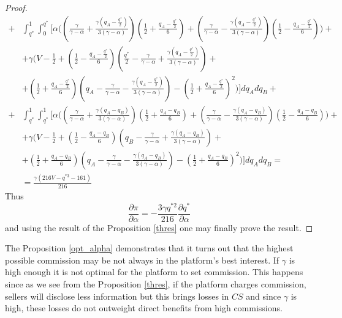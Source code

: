\documentclass[a4paper]{article}
\begin{document}
\begin{proof}
\begin{align*}
	 +
	 &\int_{q^*}^{1} \int_{0}^{q^*} \biggl[ \alpha \biggl( \left( \frac{\gamma}{\gamma - \alpha} + \frac{\gamma\left(q_A - \frac{q^*}{2} \right) }{3(\gamma - \alpha)} \right)\left(\frac{1}{2} + \frac{q_A - \frac{q^*}{2}}{6} \right) + \left( \frac{\gamma}{\gamma - \alpha} - \frac{\gamma\left(q_A- \frac{q^*}{2} \right) }{3(\gamma - \alpha)} \right)\left(\frac{1}{2} - \frac{q_A -\frac{q^*}{2}}{6} \right) \biggr)+\\
	 &+\gamma \biggl(V - \frac{1}{2} + \left(\frac{1}{2} - \frac{q_A-\frac{q^*}{2}}{6} \right) \left( \frac{q^*}{2} - \frac{\gamma}{\gamma - \alpha} + \frac{\gamma \left(q_A -  \frac{q^*}{2} \right)}{3 (\gamma - \alpha)} \right)  + \\
	 &+ \left(\frac{1}{2} + \frac{q_A-\frac{q^*}{2}}{6} \right) \left(q_A - \frac{\gamma}{\gamma - \alpha} - \frac{\gamma \left(q_A- \frac{q^*}{2} \right)}{3(\gamma - \alpha)} \right)  - \left( \frac{1}{2} + \frac{q_A - \frac{q^*}{2}}{6} \right)^2 \biggr)  \biggr] dq_A dq_B + \\
	 +
	  &\int_{q^*}^{1} \int_{q^*}^{1} \biggl[ \alpha \biggl( \left( \frac{\gamma}{\gamma - \alpha} + \frac{\gamma\left(q_A - q_B \right) }{3(\gamma - \alpha)} \right)\left(\frac{1}{2} + \frac{q_A - q_B}{6} \right) + \left( \frac{\gamma}{\gamma - \alpha} - \frac{\gamma\left(q_A- q_B \right) }{3(\gamma - \alpha)} \right)\left(\frac{1}{2} - \frac{q_A -q_B}{6} \right) \biggr)+\\
	 &+\gamma \biggl(V - \frac{1}{2} + \left(\frac{1}{2} - \frac{q_A-q_B}{6} \right) \left( q_B - \frac{\gamma}{\gamma - \alpha} + \frac{\gamma \left(q_A -  q_B \right)}{3 (\gamma - \alpha)} \right)  + \\
	 &+ \left(\frac{1}{2} + \frac{q_A-q_B}{6} \right) \left(q_A - \frac{\gamma}{\gamma - \alpha} - \frac{\gamma \left(q_A- q_B \right)}{3(\gamma - \alpha)} \right)  - \left( \frac{1}{2} + \frac{q_A - q_B}{6} \right)^2 \biggr)  \biggr] dq_A dq_B = \\
	 & = \frac{\gamma(216 V - q^{*3} - 161)}{216}
	\end{align*}
	Thus $$\frac{\partial \pi}{\partial \alpha} = -\frac{3 \gamma q^{*2}}{216} \frac{\partial q^*}{\partial \alpha}$$ and using the result of the Proposition \ref{thres} one may finally prove the result.
\end{proof}

The Proposition \ref{opt_alpha} demonstrates that it turns out that the highest possible commission may be not always in the platform's best interest. If $\gamma$ is high enough it is not optimal for the platform to set commission. This happens since as we see from the Proposition \ref{thres}, if the platform charges commission, sellers will disclose less information but this brings losses in $CS$ and since $\gamma$ is high, these losses do not outweight direct benefits from high commissions. 
\end{document}
